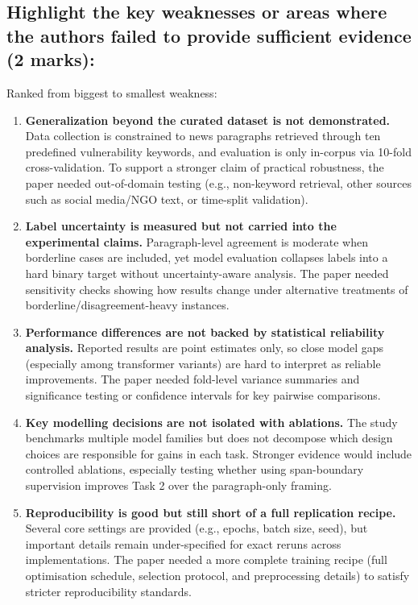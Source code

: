 \documentclass[11pt, a4paper]{article}
\begin{document}
\subsection{Highlight the key weaknesses or areas where the authors failed to provide sufficient evidence (2 marks):}
Ranked from biggest to smallest weakness:
\begin{enumerate}
  \item \textbf{Generalization beyond the curated dataset is not demonstrated.} Data collection is constrained to news paragraphs retrieved through ten predefined vulnerability keywords, and evaluation is only in-corpus via 10-fold cross-validation. To support a stronger claim of practical robustness, the paper needed out-of-domain testing (e.g., non-keyword retrieval, other sources such as social media/NGO text, or time-split validation).

  \item \textbf{Label uncertainty is measured but not carried into the experimental claims.} Paragraph-level agreement is moderate when borderline cases are included, yet model evaluation collapses labels into a hard binary target without uncertainty-aware analysis. The paper needed sensitivity checks showing how results change under alternative treatments of borderline/disagreement-heavy instances.

  \item \textbf{Performance differences are not backed by statistical reliability analysis.} Reported results are point estimates only, so close model gaps (especially among transformer variants) are hard to interpret as reliable improvements. The paper needed fold-level variance summaries and significance testing or confidence intervals for key pairwise comparisons.

  \item \textbf{Key modelling decisions are not isolated with ablations.} The study benchmarks multiple model families but does not decompose which design choices are responsible for gains in each task. Stronger evidence would include controlled ablations, especially testing whether using span-boundary supervision improves Task 2 over the paragraph-only framing.

  \item \textbf{Reproducibility is good but still short of a full replication recipe.} Several core settings are provided (e.g., epochs, batch size, seed), but important details remain under-specified for exact reruns across implementations. The paper needed a more complete training recipe (full optimisation schedule, selection protocol, and preprocessing details) to satisfy stricter reproducibility standards.
\end{enumerate}
\end{document}

